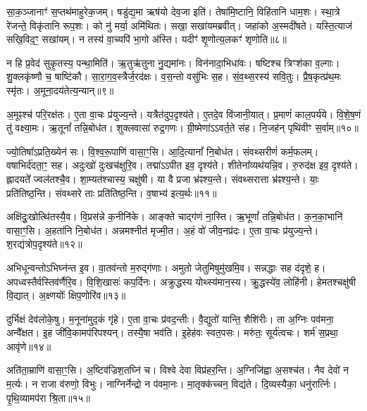 सा॒क॒ञ्जानाꣳ॑ स॒प्तथ॑माहुरेक॒जम्। षडु॑द्य॒मा ऋष॑यो देव॒जा इति॑। 
तेषा॑मि॒ष्टानि॒ विहि॑तानि धाम॒शः। स्था॒त्रे रे॑जन्ते॒ विकृ॑तानि रूप॒शः। 
को नु॑ मर्या॒ अमि॑थितः। सखा॒ सखा॑यमब्रवीत्। 
जहा॑को अ॒स्मदी॑षते। यस्ति॒त्याज॑ सखि॒विद॒ꣳ॒ सखा॑यम्। 
न तस्य॑ वा॒च्यपि॑ भा॒गो अ॑स्ति। यदीꣳ॑ शृ॒णोत्य॒लकꣳ॑ शृणोति॥८॥

न हि प्र॒वेद॑ सुकृ॒तस्य॒ पन्था॒मिति॑। ऋ॒तु\ur{}ऋ॑तुना नु॒द्यमा॑नः। 
विन॑नादा॒भिधा॑वः। षष्टिश्च त्रिꣳश॑का व॒ल्गाः। 
शु॒क्लकृ॑ष्णौ च॒ षाष्टि॑कौ। सा॒रा॒ग॒व॒स्त्रैर्ज॒रद॑क्षः। 
व॒स॒न्तो वसु॑भिः स॒ह। सं॒व॒थ्स॒रस्य॑ सवि॒तुः। 
प्रै॒ष॒कृत्प्र॑थ॒मः स्मृ॑तः। अ॒मूना॒दय॑तेत्य॒न्यान्॥९॥

अ॒मूꣴश्च॑ परि॒रक्ष॑तः। ए॒ता वा॒चः प्र॑युज्य॒न्ते। 
यत्रैत॑दुप॒दृश्य॑ते। ए॒तदे॒व वि॑जानी॒यात्। 
प्र॒माणं॑ काल॒पर्य॑ये। वि॒शे॒ष॒णं तु॑ वक्ष्या॒मः। 
ऋ॒तूनां᳚ तन्नि॒बोध॑त। शुक्लवासा॑ रुद्र॒गणः। 
ग्री॒ष्मेणा॑ऽऽवर्त॒ते स॑ह। नि॒जह॑न्‌ पृथि॑वीꣳ स॒र्वाम्॥१०॥

ज्यो॒तिषा᳚ऽप्रति॒ख्येन॑ सः। वि॒श्व॒रू॒पाणि॑ वासा॒ꣳ॒सि। 
आ॒दि॒त्यानां᳚ नि॒बोध॑त। संवथ्सरीणं॑ कर्म॒फलम्। 
व\ur{}षाभिर्द॑दता॒ꣳ॒ सह। अदुःखो॑ दुःखच॑क्षुरि॒व। 
तद्मा॑ऽऽपीत इव॒ दृश्य॑ते। शीतेना᳚व्यथ॑यन्नि॒व। 
रु॒रुद॑क्ष इव॒ दृश्य॑ते। ह्लादयते᳚ ज्वल॑तश्चै॒व। 
शा॒म्यत॑श्चास्य॒ चक्षु॑षी। या वै प्रजा भ्र॑ꣴश्य॒न्ते। 
संवथ्सरात्ता भ्र॑ꣴश्य॒न्ते। याः॒ प्रति॑तिष्ठ॒न्ति। 
संवथ्सरे ताः प्रति॑तिष्ठ॒न्ति। व॒\ar{}षाभ्य॑ इत्य॒र्थः॥११॥\anuvakamend


अक्षि॑दुः॒खोत्थि॑तस्यै॒व। वि॒प्रस॑न्ने क॒नीनि॑के। 
आङ्क्ते चाद्ग॑णं ना॒स्ति। ऋ॒भूणां᳚ तन्नि॒बोध॑त। 
क॒न॒का॒भानि॑ वासा॒ꣳ॒सि। अ॒हता॑नि नि॒बोध॑त। 
अन्नमश्नीत॑ मृज्मी॒त। अ॒हं वो॑ जीव॒नप्र॑दः। 
ए॒ता वा॒चः प्र॑युज्य॒न्ते। श॒रद्य॑त्रोप॒दृश्य॑ते॥१२॥

अभिधून्वन्तोऽभिघ्न॑न्त इ॒व। वा॒तव॑न्तो म॒रुद्ग॑णाः। 
अमुतो जेतुमिषुमु॑खमि॒व। सन्नद्धाः सह द॑दृशे॒ ह। 
अपध्वस्तैर्वस्तिव॑र्णैरि॒व। वि॒शि॒खासः॑ कप॒र्दिनः। 
अक्रुद्धस्य योथ्स्य॑मान॒स्य। क्रु॒द्धस्ये॑व॒ लोहि॑नी। 
हेमतश्चक्षु॑षी वि॒द्यात्। अ॒क्ष्णयोः᳚ क्षिप॒णोरि॑व॥१३॥

दुर्भिक्षं देव॑लोके॒षु। म॒नूना॑मुद॒कं गृ॑हे। 
ए॒ता वा॒चः प्र॑वद॒न्तीः। वै॒द्युतो॑ यान्ति॒ शैशि॑रीः। 
ता अ॒ग्निः पव॑मना॒ अन्वै᳚क्षत। इ॒ह जी॑वि॒कामप॑रिपश्यन्। 
तस्यै॒षा भव॑ति। इ॒हेह॑वः स्वत॒पसः। 
मरु॑तः॒ सूर्य॑त्वचः। शर्म॑ स॒प्रथा॒ आवृ॑णे॥१४॥\anuvakamend


अति॑ता॒म्राणि॑ वासा॒ꣳ॒सि। अ॒ष्टिव॑ज्रिश॒तघ्नि॑ च। 
विश्वे देवा विप्र॑हर॒न्ति। अ॒ग्निजि॑ह्वा अ॒सश्च॑त। 
नैव देवो॑ न म॒र्त्यः। न राजा व॑रुणो॒ विभुः। 
नाग्निर्नेन्द्रो न प॑वमा॒नः। मा॒तृक्क॑च्चन॒ विद्य॑ते। 
दि॒व्यस्यैका॒ धनु॑रार्त्निः। पृ॒थि॒व्यामप॑रा श्रि॒ता॥१५॥

